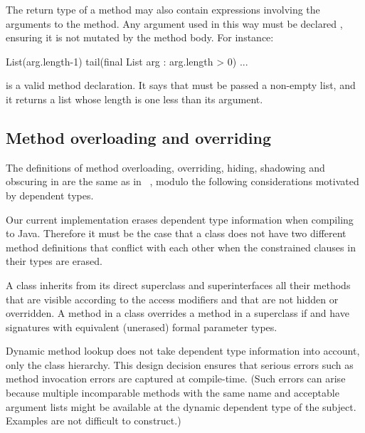 The
return type of a method may also contain expressions involving the
arguments to the method.  Any argument used in this way must
be declared ,
ensuring it is not mutated by the method body.  For instance:
\begin{displayxten}
  List(arg.length-1) tail(final List arg : arg.length > 0) {...}
\end{displayxten}
\noindent is a valid method declaration. It says that
 must be passed a non-empty list, and it returns a list
whose length is one less than its argument.

\subsection{Method overloading and overriding}

The definitions of method overloading, overriding, hiding,
shadowing and obscuring in \Xten{} are the same as in
\Java~\cite{Java3}, modulo the following considerations
motivated by dependent types.

Our current implementation
erases dependent type information when compiling to Java. Therefore it
must be the case that a class does not have two different method
definitions that conflict with each other when the constrained
clauses in their types are erased.

A class  inherits from its direct superclass and
superinterfaces all their methods that are visible according to the access
modifiers and that are not hidden or overridden. A method
 in a class  overrides a method  in a
superclass  if  and  have signatures
with equivalent (unerased) formal parameter types. 

Dynamic method lookup does not take dependent type information into
account, only the class hierarchy. This design decision ensures that
serious errors such as method invocation errors are captured at
compile-time. (Such errors can arise because multiple incomparable
methods with the same name and acceptable argument lists might be
available at the dynamic dependent type of the subject. Examples are
not difficult to construct.)


